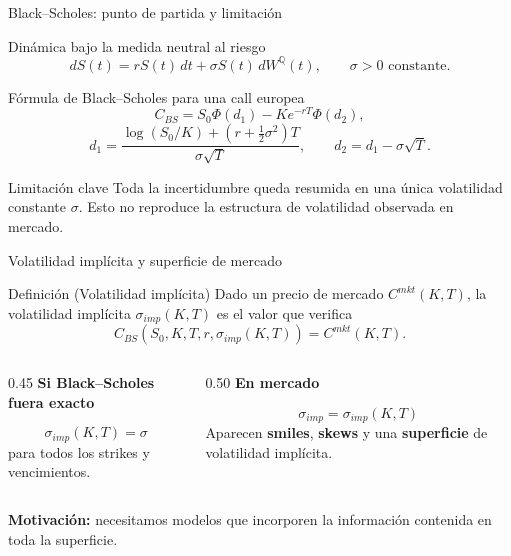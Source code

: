 \documentclass[8pt]{beamer}
\begin{document}
\begin{frame}{Black--Scholes: punto de partida y limitación}
\begin{block}{Dinámica bajo la medida neutral al riesgo}
\[
    dS(t)=rS(t)\,dt+\sigma S(t)\,dW^{\mathbb Q}(t), \qquad \sigma>0 \text{ constante.}
\]
\end{block}
\pause

\begin{block}{Fórmula de Black--Scholes para una call europea}
\[
    C_{BS}=S_0\Phi(d_1)-Ke^{-rT}\Phi(d_2),
\]
\[
    d_1=
    \frac{\log(S_0/K)+(r+\frac{1}{2}\sigma^2)T}{\sigma\sqrt{T}},
    \qquad
    d_2=d_1-\sigma\sqrt{T}.
\]
\end{block}
\pause

\begin{alertblock}{Limitación clave}
Toda la incertidumbre queda resumida en una única volatilidad constante $\sigma$. Esto no reproduce la estructura de volatilidad observada en mercado.
\end{alertblock}
\end{frame}

\begin{frame}{Volatilidad implícita y superficie de mercado}
\begin{block}{Definición (Volatilidad implícita)}
Dado un precio de mercado $C^{mkt}(K,T)$, la volatilidad implícita 
$\sigma_{imp}(K,T)$ es el valor que verifica
\[
    C_{BS}(S_0,K,T,r,\sigma_{imp}(K,T))=C^{mkt}(K,T).
\]
\end{block}
\pause

\begin{columns}[T]
\begin{column}{0.45\textwidth}
\textbf{Si Black--Scholes fuera exacto}

\[
\sigma_{imp}(K,T)=\sigma
\]
para todos los strikes y vencimientos.

\end{column}
\begin{column}{0.50\textwidth}
\textbf{En mercado}

\[
\sigma_{imp}=\sigma_{imp}(K,T)
\]
Aparecen \textbf{smiles}, \textbf{skews} y una \textbf{superficie} de volatilidad implícita.

\end{column}
\end{columns}
\pause

\begin{center}
\textbf{Motivación:} necesitamos modelos que incorporen la información contenida en toda la superficie.
\end{center}
\end{frame}
\end{document}
